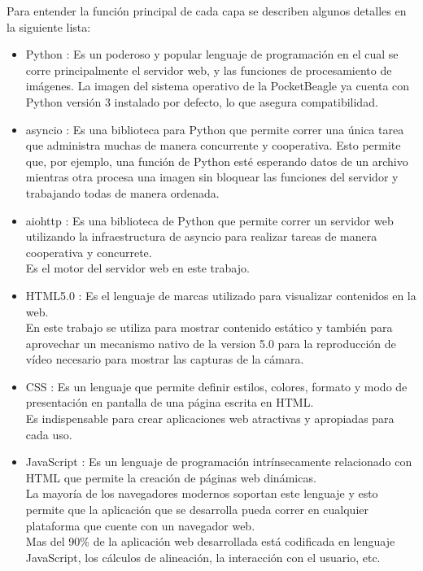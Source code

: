    Para entender la función principal de cada capa se describen algunos detalles en la siguiente lista:
   \begin{itemize}
      \item{Python \citep{WEBSITE:python}: Es un poderoso y popular lenguaje de programación en el cual se corre principalmente el servidor web, y las funciones de procesamiento de imágenes. La imagen del sistema operativo de la PocketBeagle ya cuenta con Python versión 3 instalado por defecto, lo que asegura compatibilidad.
      }
      \item{asyncio \citep{WEBSITE:asyncio}: Es una biblioteca para Python que permite correr una única tarea que administra muchas de manera concurrente y cooperativa.
      Esto permite que, por ejemplo, una función de Python esté esperando datos de un archivo mientras otra procesa una imagen sin bloquear las funciones del servidor y trabajando todas de manera ordenada.
      }
      \item{aiohttp \citep{WEBSITE:aiohttp}: Es una biblioteca de Python que permite correr un servidor web utilizando la infraestructura de asyncio para realizar tareas de manera cooperativa y concurrete.\\
      Es el motor del servidor web en este trabajo.
      }
      \item{HTML5.0 \citep{WEBSITE:html5}: Es el lenguaje de marcas utilizado para visualizar contenidos en la web.\\
         En este trabajo se utiliza para mostrar contenido estático y también para aprovechar un mecanismo nativo de la version 5.0 para la reproducción de vídeo necesario para mostrar las capturas de la cámara.
      }
      \item{CSS \citep{WEBSITE:css}: Es un lenguaje que permite definir estilos, colores, formato y modo de presentación en pantalla de una página escrita en HTML.\\
      Es indispensable para crear aplicaciones web atractivas y apropiadas para cada uso.
      }
      \item{JavaScript \citep{WEBSITE:javascript}: Es un lenguaje de programación intrínsecamente relacionado con HTML que permite la creación de páginas web dinámicas.\\
         La mayoría de los navegadores modernos soportan este lenguaje y esto permite que la aplicación que se desarrolla pueda correr en cualquier plataforma que cuente con un navegador web. \\
         Mas del 90\% de la aplicación web desarrollada está codificada en lenguaje JavaScript, los cálculos de alineación, la interacción con el usuario, etc.\\
}
\end{itemize}

